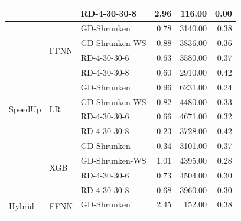 \begin{table}[ht]
\begin{tabular}{lllrrr}
		                          &                       & RD-4-30-30-8     & 2.96         & 116.00              & 0.00                    \\\hline
		\multirow{12}{*}{SpeedUp} & \multirow{4}{*}{FFNN} & GD-Shrunken      & 0.78         & 3140.00             & 0.38                    \\\cline{3-6}
		                          &                       & GD-Shrunken-WS   & 0.88         & 3836.00             & 0.36                    \\\cline{3-6}
		                          &                       & RD-4-30-30-6     & 0.63         & 3580.00             & 0.37                    \\\cline{3-6}
		                          &                       & RD-4-30-30-8     & 0.60         & 2910.00             & 0.42                    \\\cline{2-6}
		                          & \multirow{4}{*}{LR}   & GD-Shrunken      & 0.96         & 6231.00             & 0.24                    \\\cline{3-6}
		                          &                       & GD-Shrunken-WS   & 0.82         & 4480.00             & 0.33                    \\\cline{3-6}
		                          &                       & RD-4-30-30-6     & 0.66         & 4671.00             & 0.32                    \\\cline{3-6}
		                          &                       & RD-4-30-30-8     & 0.23         & 3728.00             & 0.42                    \\\cline{2-6}
		                          & \multirow{4}{*}{XGB}  & GD-Shrunken      & 0.34         & 3101.00             & 0.37                    \\\cline{3-6}
		                          &                       & GD-Shrunken-WS   & 1.01         & 4395.00             & 0.28                    \\\cline{3-6}
		                          &                       & RD-4-30-30-6     & 0.73         & 4504.00             & 0.30                    \\\cline{3-6}
		                          &                       & RD-4-30-30-8     & 0.68         & 3960.00             & 0.30                    \\\hline
		\multirow{12}{*}{Hybrid}  & \multirow{4}{*}{FFNN} & GD-Shrunken      & 2.45         & 152.00              & 0.38                    \\\cline{3-6}

\end{tabular}
\end{table}
